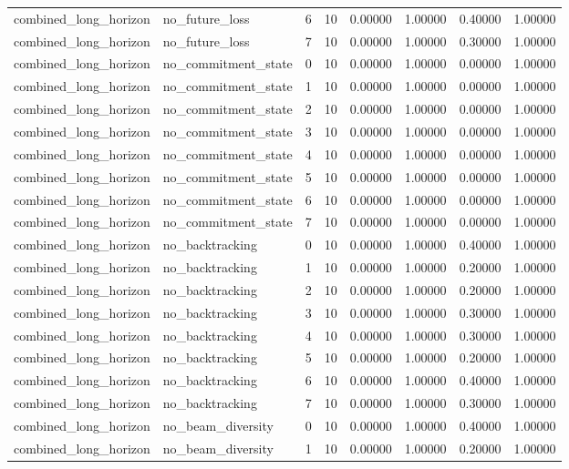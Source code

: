 \documentclass{article}
\begin{document}
\begin{table}[tbp]
{\begin{tabular}{llllllll}
combined\_long\_horizon & no\_future\_loss & 6 & 10 & 0.00000 & 1.00000 & 0.40000 & 1.00000 \\
combined\_long\_horizon & no\_future\_loss & 7 & 10 & 0.00000 & 1.00000 & 0.30000 & 1.00000 \\
combined\_long\_horizon & no\_commitment\_state & 0 & 10 & 0.00000 & 1.00000 & 0.00000 & 1.00000 \\
combined\_long\_horizon & no\_commitment\_state & 1 & 10 & 0.00000 & 1.00000 & 0.00000 & 1.00000 \\
combined\_long\_horizon & no\_commitment\_state & 2 & 10 & 0.00000 & 1.00000 & 0.00000 & 1.00000 \\
combined\_long\_horizon & no\_commitment\_state & 3 & 10 & 0.00000 & 1.00000 & 0.00000 & 1.00000 \\
combined\_long\_horizon & no\_commitment\_state & 4 & 10 & 0.00000 & 1.00000 & 0.00000 & 1.00000 \\
combined\_long\_horizon & no\_commitment\_state & 5 & 10 & 0.00000 & 1.00000 & 0.00000 & 1.00000 \\
combined\_long\_horizon & no\_commitment\_state & 6 & 10 & 0.00000 & 1.00000 & 0.00000 & 1.00000 \\
combined\_long\_horizon & no\_commitment\_state & 7 & 10 & 0.00000 & 1.00000 & 0.00000 & 1.00000 \\
combined\_long\_horizon & no\_backtracking & 0 & 10 & 0.00000 & 1.00000 & 0.40000 & 1.00000 \\
combined\_long\_horizon & no\_backtracking & 1 & 10 & 0.00000 & 1.00000 & 0.20000 & 1.00000 \\
combined\_long\_horizon & no\_backtracking & 2 & 10 & 0.00000 & 1.00000 & 0.20000 & 1.00000 \\
combined\_long\_horizon & no\_backtracking & 3 & 10 & 0.00000 & 1.00000 & 0.30000 & 1.00000 \\
combined\_long\_horizon & no\_backtracking & 4 & 10 & 0.00000 & 1.00000 & 0.30000 & 1.00000 \\
combined\_long\_horizon & no\_backtracking & 5 & 10 & 0.00000 & 1.00000 & 0.20000 & 1.00000 \\
combined\_long\_horizon & no\_backtracking & 6 & 10 & 0.00000 & 1.00000 & 0.40000 & 1.00000 \\
combined\_long\_horizon & no\_backtracking & 7 & 10 & 0.00000 & 1.00000 & 0.30000 & 1.00000 \\
combined\_long\_horizon & no\_beam\_diversity & 0 & 10 & 0.00000 & 1.00000 & 0.40000 & 1.00000 \\
combined\_long\_horizon & no\_beam\_diversity & 1 & 10 & 0.00000 & 1.00000 & 0.20000 & 1.00000 \\
\bottomrule
\end{tabular}
}
\end{table}
\end{document}
